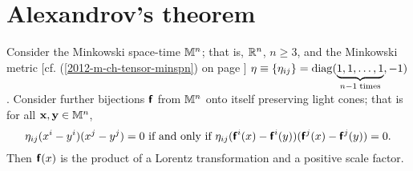 \section{Alexandrov's theorem}

Consider the Minkowski space-time
${\Bbb M}^n$; that is,  ${\Bbb R}^n$, $n\ge 3$, and the Minkowski metric
[cf. (\ref{2012-m-ch-tensor-minspn}) on page \pageref{2012-m-ch-tensor-minspn}]
$\eta \equiv \{\eta_{ij}\}={\rm diag} (\underbrace{1,1,\ldots ,1}_{n-1\; {\rm times}},-1)$.
Consider further  bijections $\textsf{\textbf{f}}$ from  ${\Bbb M}^n$
onto itself preserving light cones; that is
for all ${\bf x}, {\bf y} \in {\Bbb M}^n$,
$$ \eta_{ij} (x^i-y^i)(x^j-y^j)=0 \textrm{ if and only if }
\eta_{ij} (\textsf{\textbf{f}}^i(x)-\textsf{\textbf{f}}^i(y))
(\textsf{\textbf{f}}^j(x)-\textsf{\textbf{f}}^j(y))=0.$$
Then $\textsf{\textbf{f}}(x)$ is the product of a Lorentz transformation
and a positive scale factor.

\begin{center}
{\color{olive}   \Huge
 \floweroneleft
}
\end{center}
